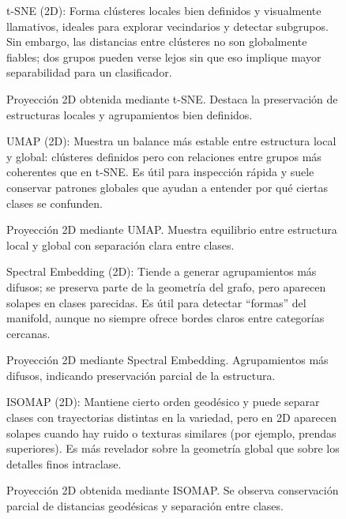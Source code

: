 \documentclass[conference]{IEEEtran}
\begin{document}
\begin{figure}[!htbp]
\centering

\vspace{-1mm}
\caption{Proyección 2D obtenida mediante t-SNE. Destaca la preservación de estructuras locales y agrupamientos bien definidos.}
\label{fig:2d_tsne}
\vspace{0.2mm}
\parbox{0.95\columnwidth}{\footnotesize\raggedright t-SNE (2D): Forma clústeres locales bien definidos y visualmente llamativos, ideales para explorar vecindarios y detectar subgrupos. Sin embargo, las distancias entre clústeres no son globalmente fiables; dos grupos pueden verse lejos sin que eso implique mayor separabilidad para un clasificador.}
\end{figure}

\begin{figure}[!htbp]
\centering

\vspace{-1mm}
\caption{Proyección 2D mediante UMAP. Muestra equilibrio entre estructura local y global con separación clara entre clases.}
\label{fig:2d_umap}
\vspace{0.2mm}
\parbox{0.95\columnwidth}{\footnotesize\raggedright UMAP (2D): Muestra un balance más estable entre estructura local y global: clústeres definidos pero con relaciones entre grupos más coherentes que en t-SNE. Es útil para inspección rápida y suele conservar patrones globales que ayudan a entender por qué ciertas clases se confunden.}
\end{figure}

\begin{figure}[!htbp]
\centering

\vspace{-1mm}
\caption{Proyección 2D mediante Spectral Embedding. Agrupamientos más difusos, indicando preservación parcial de la estructura.}
\label{fig:2d_spectral}
\vspace{0.2mm}
\parbox{0.95\columnwidth}{\footnotesize\raggedright Spectral Embedding (2D): Tiende a generar agrupamientos más difusos; se preserva parte de la geometría del grafo, pero aparecen solapes en clases parecidas. Es útil para detectar ``formas'' del manifold, aunque no siempre ofrece bordes claros entre categorías cercanas.}
\end{figure}

\begin{figure}[!htbp]
\centering

\vspace{-1mm}
\caption{Proyección 2D obtenida mediante ISOMAP. Se observa conservación parcial de distancias geodésicas y separación entre clases.}
\label{fig:2d_isomap}
\vspace{0.2mm}
\parbox{0.95\columnwidth}{\footnotesize\raggedright ISOMAP (2D): Mantiene cierto orden geodésico y puede separar clases con trayectorias distintas en la variedad, pero en 2D aparecen solapes cuando hay ruido o texturas similares (por ejemplo, prendas superiores). Es más revelador sobre la geometría global que sobre los detalles finos intraclase.}
\end{figure}
\end{document}
